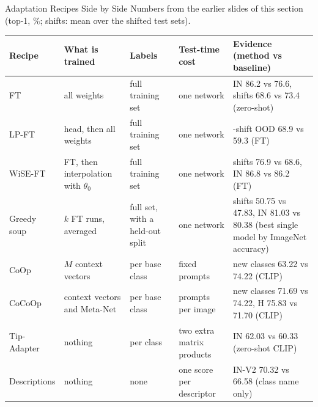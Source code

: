 \begin{frame}{Adaptation Recipes Side by Side}
  \footnotesize
  Numbers from the earlier slides of this section (top-1, \%; shifts: mean over the shifted test sets).
  \vspace{0.3em}

  {\centering\scriptsize\setlength{\tabcolsep}{4pt}
  \begin{tabular}{>{\raggedright\arraybackslash}p{1.6cm} >{\raggedright\arraybackslash}p{2.4cm} >{\raggedright\arraybackslash}p{2.0cm} >{\raggedright\arraybackslash}p{2.1cm} >{\raggedright\arraybackslash}p{4.1cm}}
    \toprule
    \textbf{Recipe} & \textbf{What is trained} & \textbf{Labels} & \textbf{Test-time cost} & \textbf{Evidence (method vs baseline)} \\
    \midrule
    FT & all weights & full training set & one network & IN 86.2 vs 76.6, shifts 68.6 vs 73.4 (zero-shot) \\
    LP-FT & head, then all weights & full training set & one network & 10-shift OOD 68.9 vs 59.3 (FT) \\
    WiSE-FT & FT, then interpolation with $\theta_0$ & full training set & one network & shifts 76.9 vs 68.6, IN 86.8 vs 86.2 (FT) \\
    Greedy soup & $k$ FT runs, averaged & full set, with a held-out split & one network & shifts 50.75 vs 47.83, IN 81.03 vs 80.38 (best single model by ImageNet accuracy) \\
    CoOp & $M$ context vectors & 16 per base class & fixed prompts & new classes 63.22 vs 74.22 (CLIP) \\
    CoCoOp & context vectors and Meta-Net & 16 per base class & prompts per image & new classes 71.69 vs 74.22, H 75.83 vs 71.70 (CLIP) \\
    Tip-Adapter & nothing & 16 per class & two extra matrix products & IN 62.03 vs 60.33 (zero-shot CLIP) \\
    Descriptions & nothing & none & one score per descriptor & IN-V2 70.32 vs 66.58 (class name only) \\
    \bottomrule
  \end{tabular}\par}
\end{frame}
